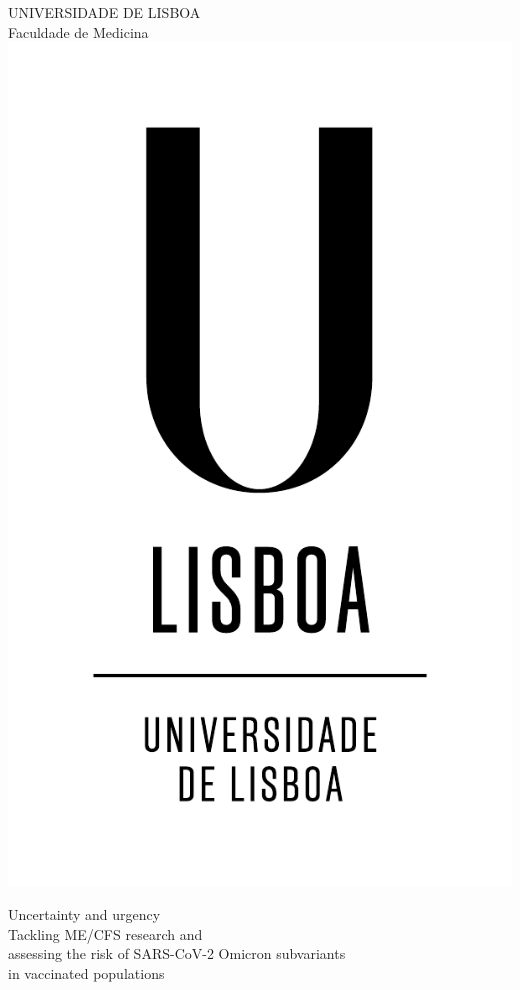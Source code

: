 \thispagestyle{empty}

\begin{center}
    {\FontMn UNIVERSIDADE DE LISBOA} \\
    {\FontMn Faculdade de Medicina} \\
    \includegraphics[bb=9cm 16cm 0cm 0cm, scale=0.35]{base-figures/ULISBOA_VERTICAL_RGB.pdf}
    
    \vspace{6cm}
    {\FontLb Uncertainty and urgency} \\
    \vspace{0.2cm}
    {\FontMn Tackling ME/CFS research and\\assessing the risk of SARS-CoV-2 Omicron subvariants\\in vaccinated populations} \\


\end{center}
